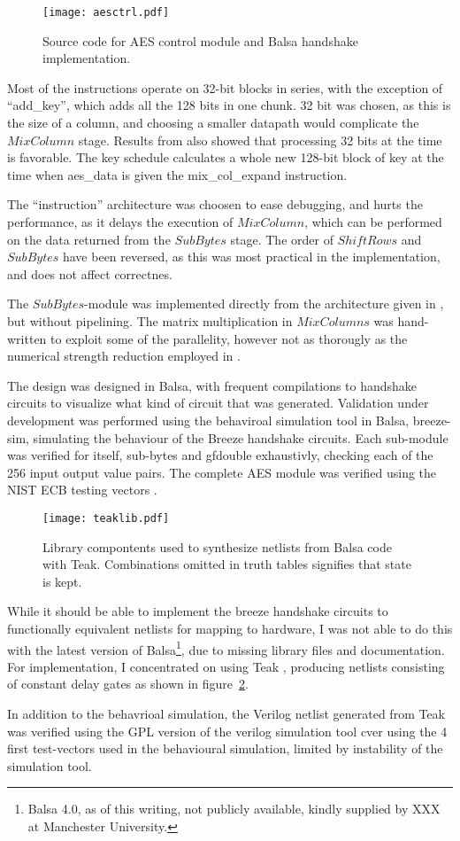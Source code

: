 \begin{figure}[htbp]
  \centering
  \texttt{[image: aesctrl.pdf]}
  \caption{Source code for AES control module and Balsa handshake
    implementation.}
  \label{fig:aesctrl}
\end{figure}

Most of the instructions operate on 32-bit blocks in series, with the
exception of ``add\_key'', which adds all the 128 bits in one
chunk. 32 bit was chosen, as this is the size of a column, and
choosing a smaller datapath would complicate the $MixColumn$
stage. Results from \cite{ekelund} also showed that processing 32 bits
at the time is favorable.  The key schedule calculates a whole new
128-bit block of key at the time when aes\_data is given the
mix\_col\_expand instruction.

The ``instruction'' architecture was choosen to ease debugging, and
hurts the performance, as it delays the execution of $MixColumn$,
which can be performed on the data returned from the $SubBytes$
stage. The order of $ShiftRows$ and $SubBytes$ have been reversed, as
this was most practical in the implementation, and does not affect
correctnes.


The $SubBytes$-module was implemented directly from the architecture
given in \cite{xxxcsbox}, but without pipelining. The matrix
multiplication in $MixColumns$ was hand-written to exploit some of the
parallelity, however not as thorougly as the numerical strength
reduction employed in \cite[pp. 20-23]{ekelund}.

The design was designed in Balsa, with frequent compilations to
handshake circuits to visualize what kind of circuit that was
generated. Validation under development was performed using the
behaviroal simulation tool in Balsa, breeze-sim, simulating the
behaviour of the Breeze handshake circuits. Each sub-module was
verified for itself, sub-bytes and gfdouble exhaustivly, checking each
of the 256 input output value pairs. The complete AES module was
verified using the NIST ECB testing vectors \cite{nisttest}.

\begin{figure}[htbp]
  \centering
  \texttt{[image: teaklib.pdf]}
  \caption{Library compontents used to synthesize netlists from Balsa
    code with Teak. Combinations omitted in truth tables signifies
    that state is kept.}
  \label{fig:teaklib}
\end{figure}

While it should be able to implement the breeze handshake circuits to
functionally equivalent netlists for mapping to hardware, I was not
able to do this with the latest version of Balsa\footnote{Balsa 4.0,
  as of this writing, not publicly available, kindly supplied by XXX
  at Manchester University.}, due to missing library files and
documentation. For implementation, I concentrated on using Teak
\cite{teak}, producing netlists consisting of constant delay gates as
shown in figure~\ref{fig:teaklib}.

In addition to the behavrioal simulation, the Verilog netlist
generated from Teak was verified using the GPL version of the verilog
simulation tool cver using the 4 first test-vectors used in the
behavioural simulation, limited by instability of the simulation tool.
